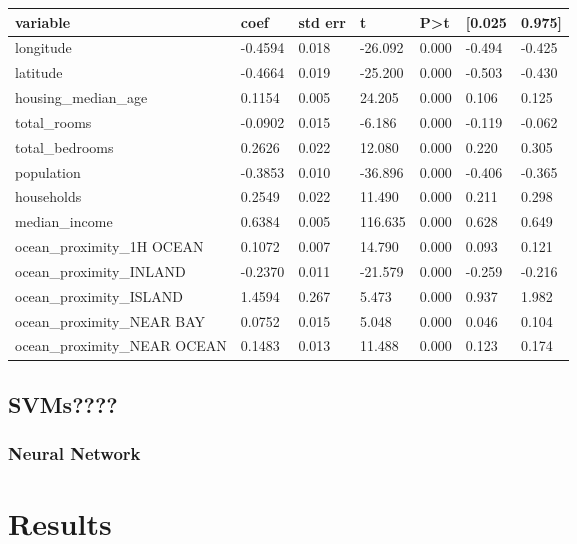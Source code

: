 \documentclass[11pt]{article}
\begin{document}
\begin{table}
\centering
\begin{tabular}{|l|l|l|l|l|l|l|} 
\hline
\textbf{variable} & \textbf{coef} & \textbf{std err} & \textbf{t} & \textbf{P\textgreater{}\textbar{}t\textbar{}} & \textbf{[0.025} & \textbf{0.975]} \\ 
\hline
longitude & -0.4594 & 0.018 & -26.092 & 0.000 & -0.494 & -0.425 \\ 
\hline
latitude & -0.4664 & 0.019 & -25.200 & 0.000 & -0.503 & -0.430 \\ 
\hline
housing\_median\_age & 0.1154 & 0.005 & 24.205 & 0.000 & 0.106 & 0.125 \\ 
\hline
total\_rooms & -0.0902 & 0.015 & -6.186 & 0.000 & -0.119 & -0.062 \\ 
\hline
total\_bedrooms & 0.2626 & 0.022 & 12.080 & 0.000 & 0.220 & 0.305 \\ 
\hline
population & -0.3853 & 0.010 & -36.896 & 0.000 & -0.406 & -0.365 \\ 
\hline
households & 0.2549 & 0.022 & 11.490 & 0.000 & 0.211 & 0.298 \\ 
\hline
median\_income & 0.6384 & 0.005 & 116.635 & 0.000 & 0.628 & 0.649 \\ 
\hline
ocean\_proximity\_1H OCEAN & 0.1072 & 0.007 & 14.790 & 0.000 & 0.093 & 0.121 \\ 
\hline
ocean\_proximity\_INLAND & -0.2370 & 0.011 & -21.579 & 0.000 & -0.259 & -0.216 \\ 
\hline
ocean\_proximity\_ISLAND & 1.4594 & 0.267 & 5.473 & 0.000 & 0.937 & 1.982 \\ 
\hline
ocean\_proximity\_NEAR BAY & 0.0752 & 0.015 & 5.048 & 0.000 & 0.046 & 0.104 \\ 
\hline
ocean\_proximity\_NEAR OCEAN & 0.1483 & 0.013 & 11.488 & 0.000 & 0.123 & 0.174 \\
\hline
\end{tabular}
\end{table}

\subsection{SVMs????}

\subsubsection{Neural Network}

\section{Results}
\end{document}
